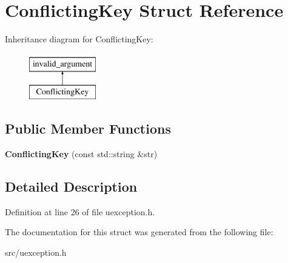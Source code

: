 \hypertarget{struct_conflicting_key}{}\section{Conflicting\+Key Struct Reference}
\label{struct_conflicting_key}
Inheritance diagram for Conflicting\+Key\+:\begin{figure}[H]
\begin{center}
\leavevmode
\includegraphics[height=2.000000cm]{struct_conflicting_key}
\end{center}
\end{figure}
\subsection*{Public Member Functions}
\begin{DoxyCompactItemize}
\item 
\mbox{\label{struct_conflicting_key_ac87d5c5f7fde32f966407684ef3c3d98}} 
{\bfseries Conflicting\+Key} (const std\+::string \&str)
\end{DoxyCompactItemize}


\subsection{Detailed Description}


Definition at line 26 of file uexception.\+h.



The documentation for this struct was generated from the following file\+:\begin{DoxyCompactItemize}
\item 
src/uexception.\+h\end{DoxyCompactItemize}
